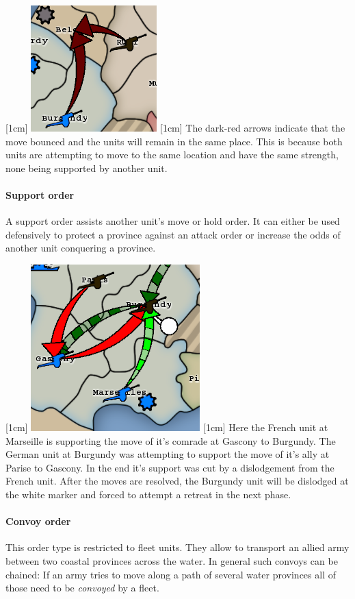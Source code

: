 \documentclass[pdftex,12pt,a4paper]{report}
\begin{document}
[1cm]
\includegraphics{./screenshots/BouncedMove.png} %
[1cm]
The dark-red arrows indicate that the move bounced and the units will
remain in the same place. This is because both units are attempting 
to move to the same location and have the same strength, none being
supported by another unit.

\paragraph{Support order}
A support order assists another unit's move or hold order. It can either be
used defensively to protect a province against an attack order or increase
the odds of another unit conquering a province. 

[1cm]
\includegraphics{./screenshots/DefRetreat0.png}
[1cm]
Here the French unit at Marseille is supporting the move of it's comrade at
Gascony to Burgundy. The German unit at Burgundy was attempting to support
the move of it's ally at Parise to Gascony. In the end  it's support was
cut by a dislodgement from the French unit. After the moves are resolved, 
the Burgundy unit will be dislodged at the white marker and forced to 
attempt a retreat in the next phase.

\paragraph{Convoy order}
This order type is restricted to fleet units. They allow to transport
an allied army between two coastal provinces across the water. In general
such convoys can be chained: If an army tries to move along a path of
several water provinces all of those need to be \textit{convoyed} 
by a fleet.
\end{document}
